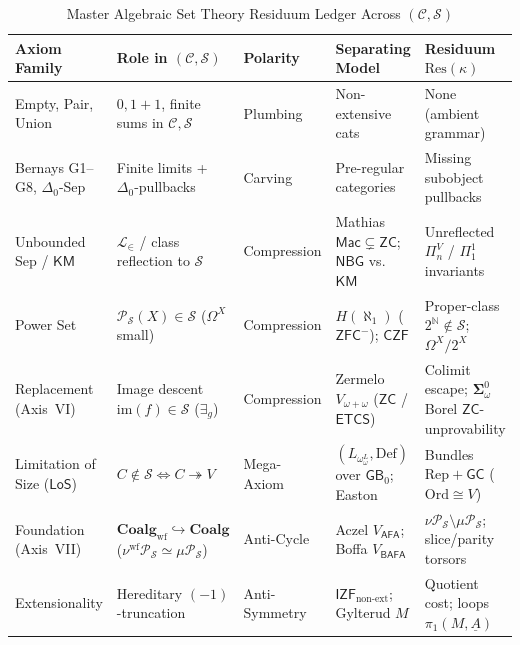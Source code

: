 
\begin{table}[htbp]
\centering
\caption{Master Algebraic Set Theory Residuum Ledger Across $(\mathcal{C}, \mathcal{S})$}\label{tab:master-ast-ledger}
\vspace{0.3em}
{\scriptsize\setlength{\tabcolsep}{2.5pt}\renewcommand{\arraystretch}{1.12}%
\begin{tabularx}{\textwidth}{@{}P{0.15\textwidth}P{0.18\textwidth}P{0.15\textwidth}YY@{}}
\toprule
\textbf{Axiom Family} & \textbf{Role in $(\mathcal{C}, \mathcal{S})$} & \textbf{Polarity} & \textbf{Separating Model} & \textbf{Residuum $\mathrm{Res}(\kappa)$} \\
\midrule
Empty, Pair, Union & $0, 1+1$, finite sums in $\mathcal{C},\mathcal{S}$ & Plumbing & Non-extensive cats & None (ambient grammar) \\
Bernays G1--G8, $\Delta_0$-Sep & Finite limits + $\Delta_0$-pullbacks & Carving & Pre-regular categories & Missing subobject pullbacks \\
Unbounded Sep / $\mathsf{KM}$ & $\mathcal{L}_\in$ / class reflection to $\mathcal{S}$ & Compression & Mathias~\cite{Mathias01} $\mathsf{Mac} \subsetneq \mathsf{ZC}$; $\mathsf{NBG}$ vs.\ $\mathsf{KM}$ & Unreflected $\Pi_n^V$ / $\Pi^1_1$ invariants \\
Power Set & $\mathcal{P}_{\mathcal{S}}(X) \in \mathcal{S}$ ($\Omega^X$ small) & Compression & $H(\aleph_1)$ ($\mathsf{ZFC}^-$); $\mathsf{CZF}$ & Proper-class $2^{\mathbb{N}} \notin \mathcal{S}$; $\Omega^X / 2^X$ \\
Replacement (Axis~VI) & Image descent $\mathrm{im}(f) \in \mathcal{S}$ ($\exists_g$) & Compression & Zermelo $V_{\omega+\omega}$ ($\mathsf{ZC}$ / $\mathsf{ETCS}$) & Colimit escape; $\boldsymbol{\Sigma}^0_\omega$ Borel $\mathsf{ZC}$-unprovability \\
Limitation of Size ($\mathsf{LoS}$) & $C \notin \mathcal{S} \iff C \twoheadrightarrow V$ & Mega-Axiom & $(L_{\omega_\omega^L}, \mathrm{Def})$ over $\mathsf{GB}_0$; Easton & Bundles $\mathrm{Rep} + \mathsf{GC}$ ($\mathrm{Ord}\cong V$) \\
Foundation (Axis~VII) & $\mathbf{Coalg}_{\mathrm{wf}} \hookrightarrow \mathbf{Coalg}$ ($\nu^{\mathrm{wf}}\mathcal{P}_{\mathcal{S}} \simeq \mu\mathcal{P}_{\mathcal{S}}$) & Anti-Cycle & Aczel $V_{\mathsf{AFA}}$; Boffa $V_{\mathsf{BAFA}}$ & $\nu \mathcal{P}_{\mathcal{S}} \setminus \mu \mathcal{P}_{\mathcal{S}}$; slice/parity torsors \\
Extensionality & Hereditary $(-1)$-truncation & Anti-Symmetry & $\mathsf{IZF}_{\mathrm{non\text{-}ext}}$; Gylterud $M$ & Quotient cost; loops $\pi_1(M,\underline{A})$ \\
\bottomrule
\end{tabularx}\par}
\end{table}

